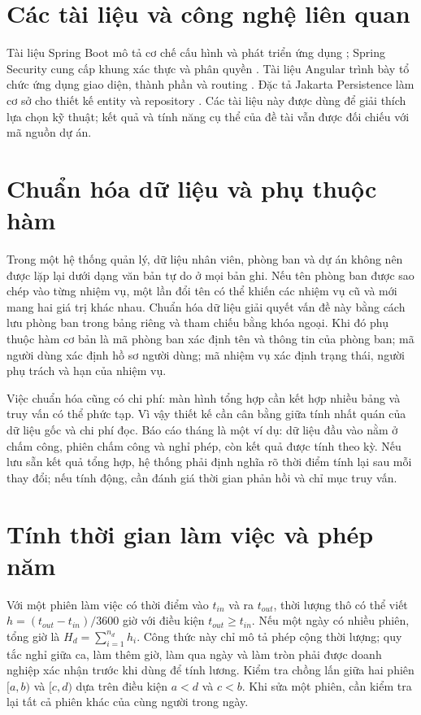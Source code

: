 \documentclass[12pt,a4paper,oneside]{report}
\begin{document}
\section{Các tài liệu và công nghệ liên quan}
Tài liệu Spring Boot mô tả cơ chế cấu hình và phát triển ứng dụng \cite{springboot}; Spring Security cung cấp khung xác thực và phân quyền \cite{security}. Tài liệu Angular trình bày tổ chức ứng dụng giao diện, thành phần và routing \cite{angular}. Đặc tả Jakarta Persistence làm cơ sở cho thiết kế entity và repository \cite{jpa}. Các tài liệu này được dùng để giải thích lựa chọn kỹ thuật; kết quả và tính năng cụ thể của đề tài vẫn được đối chiếu với mã nguồn dự án.

\section{Chuẩn hóa dữ liệu và phụ thuộc hàm}
Trong một hệ thống quản lý, dữ liệu nhân viên, phòng ban và dự án không nên được lặp lại dưới dạng văn bản tự do ở mọi bản ghi. Nếu tên phòng ban được sao chép vào từng nhiệm vụ, một lần đổi tên có thể khiến các nhiệm vụ cũ và mới mang hai giá trị khác nhau. Chuẩn hóa dữ liệu giải quyết vấn đề này bằng cách lưu phòng ban trong bảng riêng và tham chiếu bằng khóa ngoại. Khi đó phụ thuộc hàm cơ bản là mã phòng ban xác định tên và thông tin của phòng ban; mã người dùng xác định hồ sơ người dùng; mã nhiệm vụ xác định trạng thái, người phụ trách và hạn của nhiệm vụ.

Việc chuẩn hóa cũng có chi phí: màn hình tổng hợp cần kết hợp nhiều bảng và truy vấn có thể phức tạp. Vì vậy thiết kế cần cân bằng giữa tính nhất quán của dữ liệu gốc và chi phí đọc. Báo cáo tháng là một ví dụ: dữ liệu đầu vào nằm ở chấm công, phiên chấm công và nghỉ phép, còn kết quả được tính theo kỳ. Nếu lưu sẵn kết quả tổng hợp, hệ thống phải định nghĩa rõ thời điểm tính lại sau mỗi thay đổi; nếu tính động, cần đánh giá thời gian phản hồi và chỉ mục truy vấn.

\section{Tính thời gian làm việc và phép năm}
Với một phiên làm việc có thời điểm vào $t_{in}$ và ra $t_{out}$, thời lượng thô có thể viết $h=(t_{out}-t_{in})/3600$ giờ với điều kiện $t_{out}\ge t_{in}$. Nếu một ngày có nhiều phiên, tổng giờ là $H_d=\sum_{i=1}^{n_d}h_i$. Công thức này chỉ mô tả phép cộng thời lượng; quy tắc nghỉ giữa ca, làm thêm giờ, làm qua ngày và làm tròn phải được doanh nghiệp xác nhận trước khi dùng để tính lương. Kiểm tra chồng lấn giữa hai phiên $[a,b)$ và $[c,d)$ dựa trên điều kiện $a<d$ và $c<b$. Khi sửa một phiên, cần kiểm tra lại tất cả phiên khác của cùng người trong ngày.
\end{document}
